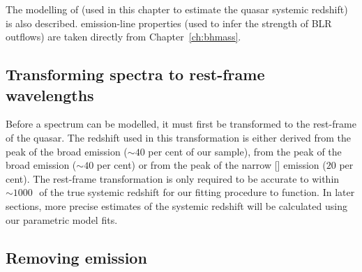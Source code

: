 The modelling of \ha (used in this chapter to estimate the quasar systemic redshift) is also described.   
 emission-line properties (used to infer the strength of BLR outflows) are taken directly from Chapter~\ref{ch:bhmass}. 

\subsection{Transforming spectra to rest-frame wavelengths}

Before a spectrum can be modelled, it must first be transformed to the rest-frame of the quasar.  
The redshift used in this transformation is either derived from the peak of the broad \ha emission ($\sim40$ per cent of our sample), from the peak of the broad \hb emission ($\sim40$ per cent) or from the peak of the narrow [] emission ($20$ per cent).
The rest-frame transformation is only required to be accurate to within $\sim1000$\,\kms\, of the true systemic redshift for our fitting procedure to function. 
In later sections, more precise estimates of the systemic redshift will be calculated using our parametric model fits. 

\subsection{Removing  emission}
\label{sec:ch4-fe-removal}

